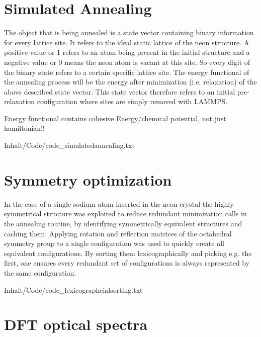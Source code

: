 \section{Simulated Annealing}
The object that is being annealed is a state vector containing binary information for every lattice site. It refers to the ideal static lattice of the neon structure. A positive value or 1 refers to an atom being present in the initial structure and a negative value or 0 means the neon atom is vacant at this site. So every digit of the binary state refers to a certain specific lattice site. The energy functional of the annealing process will be the energy after minimization (i.e. relaxation) of the above described state vector. This state vector therefore refers to an initial pre-relaxation configuration where sites are simply removed with \ac{LAMMPS}.

Energy functional contains cohesive Energy/chemical potential, not just hamiltonian!!

{Inhalt/Code/code_simulatedannealing.txt}

\section{Symmetry optimization} 
In the case of a single sodium atom inserted in the neon crystal the highly symmetrical structure was exploited to reduce redundant minimization calls in the annealing routine, by identifying symmetrically equivalent structures and caching them. Applying rotation and reflection matrices of the octahedral symmetry group to a single configuration was used to quickly create all equivalent configurations. By sorting them lexicographically and picking e.g. the first, one ensures every redundant set of configurations is always represented by the same configuration.


{Inhalt/Code/code_lexicographcialsorting.txt} 

\section{DFT optical spectra}






%